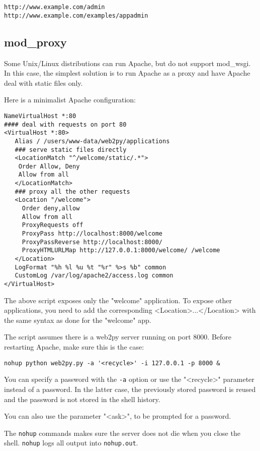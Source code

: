 \documentclass[justified,sixbynine,notoc]{tufte-book}
\def\ft{\small\tt}
\begin{document}
\begin{fullwidth}
\begin{lstlisting}[keywords={}]
http://www.example.com/admin
http://www.example.com/examples/appadmin
\end{lstlisting}

\goodbreak\subsection{mod\_proxy}

Some Unix/Linux distributions can run Apache, but do not support mod\_wsgi. In this case, the simplest solution is to run Apache as a proxy and have Apache deal with static files only.

Here is a minimalist Apache configuration:
\begin{lstlisting}
NameVirtualHost *:80
#### deal with requests on port 80
<VirtualHost *:80>
   Alias / /users/www-data/web2py/applications
   ### serve static files directly
   <LocationMatch "^/welcome/static/.*">
    Order Allow, Deny
    Allow from all
   </LocationMatch>
   ### proxy all the other requests
   <Location "/welcome">
     Order deny,allow
     Allow from all
     ProxyRequests off
     ProxyPass http://localhost:8000/welcome
     ProxyPassReverse http://localhost:8000/
     ProxyHTMLURLMap http://127.0.0.1:8000/welcome/ /welcome
   </Location>
   LogFormat "%h %l %u %t "%r" %>s %b" common
   CustomLog /var/log/apache2/access.log common
</VirtualHost>
\end{lstlisting}

The above script exposes only the "welcome" application. To expose other applications, you need to add the corresponding <Location>...</Location> with the same syntax as done for the "welcome" app.

The script assumes there is a web2py server running on port 8000. Before restarting Apache, make sure this is the case:
\begin{lstlisting}
nohup python web2py.py -a '<recycle>' -i 127.0.0.1 -p 8000 &
\end{lstlisting}

You can specify a password with the {\ft -a} option or use the "<recycle>" parameter instead of a password. In the latter case, the previously stored password is reused and the password is not stored in the shell history.

You can also use the parameter "<ask>", to be prompted for a password.

The {\ft nohup} commands makes sure the server does not die when you close the shell. {\ft nohup} logs all output into {\ft nohup.out}.


\end{fullwidth}
\end{document}
